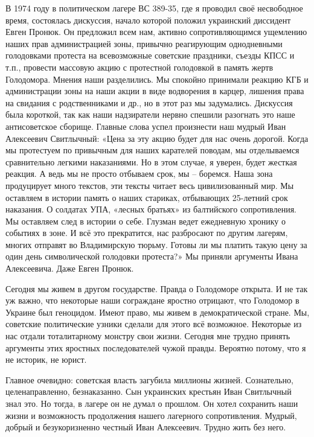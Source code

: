 В 1974 году в политическом лагере ВС 389-35, где я проводил своё несвободное
время, состоялась дискуссия, начало которой положил украинский диссидент Евген
Пронюк. Он предложил всем нам, активно сопротивляющимся ущемлению наших прав
администрацией зоны,  привычно реагирующим однодневными голодовками протеста на
всевозможные советские праздники, съезды КПСС и т.п., провести массовую акцию с
протестной голодовкой в память жертв Голодомора. Мнения наши разделились. Мы
спокойно принимали реакцию КГБ и администрации зоны на наши акции в виде
водворения в карцер, лишения права на свидания с родственниками и др., но в
этот раз мы задумались. Дискуссия была короткой, так как наши надзиратели
нервно спешили разогнать это наше антисоветское сборище. Главные слова успел
произнести наш мудрый Иван Алексеевич Свитлычный: «Цена за эту акцию будет для
нас очень дорогой. Когда мы протестуем по привычным для наших карателей
поводам, мы отделываемся сравнительно легкими наказаниями. Но в этом случае, я
уверен, будет жесткая реакция. А ведь мы не просто отбываем срок, мы – боремся.
Наша зона продуцирует много текстов, эти тексты читает весь цивилизованный мир.
Мы оставляем в истории память о наших стариках, отбывающих 25-летний срок
наказания. О солдатах УПА, «лесных братьях» из балтийского сопротивления. Мы
оставляем след в истории о себе. Глузман ведет ежедневную хронику о событиях в
зоне. И всё это прекратится, нас разбросают по другим лагерям, многих отправят
во Владимирскую тюрьму. Готовы ли мы платить такую цену за один день
символической голодовки протеста?»  Мы приняли аргументы Ивана Алексеевича.
Даже Евген Пронюк.

Сегодня мы живем в другом государстве. Правда о Голодоморе открыта. И не так уж
важно, что некоторые наши сограждане яростно отрицают, что Голодомор в Украине
был геноцидом. Имеют право, мы живем в демократической стране. Мы, советские
политические узники сделали для этого всё возможное. Некоторые из нас отдали
тоталитарному монстру свои жизни. Сегодня мне трудно принять аргументы этих
яростных последователей чужой правды. Вероятно потому, что я не историк, не
юрист.

Главное очевидно: советская власть загубила миллионы жизней. Сознательно,
целенаправленно, безнаказанно. Сын украинских крестьян Иван Свитлычный знал
это. Но тогда, в лагере он не думал о прошлом. Он хотел сохранить наши жизни и
возможность продолжения нашего лагерного сопротивления. Мудрый, добрый и
безукоризненно честный Иван Алексеевич. Трудно жить без него.
